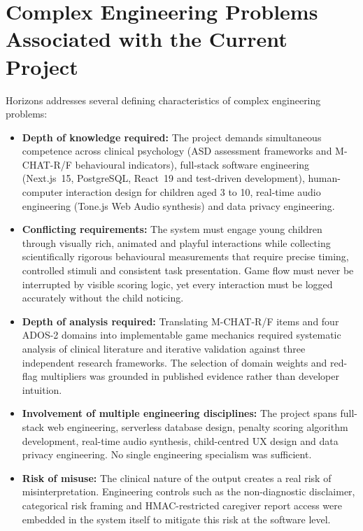 \documentclass[12pt,a4paper,oneside]{report}
\begin{document}
	\section{Complex Engineering Problems Associated with the Current Project}
	
	Horizons addresses several defining characteristics of complex engineering problems:
	
	\begin{itemize}[leftmargin=0.5in]
		\item \textbf{Depth of knowledge required:} The project demands simultaneous competence across clinical psychology (ASD assessment frameworks and M-CHAT-R/F behavioural indicators), full-stack software engineering (Next.js~15, PostgreSQL, React~19 and test-driven development), human-computer interaction design for children aged 3 to 10, real-time audio engineering (Tone.js Web Audio synthesis) and data privacy engineering.
		
		\item \textbf{Conflicting requirements:} The system must engage young children through visually rich, animated and playful interactions while collecting scientifically rigorous behavioural measurements that require precise timing, controlled stimuli and consistent task presentation. Game flow must never be interrupted by visible scoring logic, yet every interaction must be logged accurately without the child noticing.
		
		\item \textbf{Depth of analysis required:} Translating M-CHAT-R/F items and four ADOS-2 domains into implementable game mechanics required systematic analysis of clinical literature and iterative validation against three independent research frameworks. The selection of domain weights and red-flag multipliers was grounded in published evidence rather than developer intuition.
		
		\item \textbf{Involvement of multiple engineering disciplines:} The project spans full-stack web engineering, serverless database design, penalty scoring algorithm development, real-time audio synthesis, child-centred UX design and data privacy engineering. No single engineering specialism was sufficient.
		
		\item \textbf{Risk of misuse:} The clinical nature of the output creates a real risk of misinterpretation. Engineering controls such as the non-diagnostic disclaimer, categorical risk framing and HMAC-restricted caregiver report access were embedded in the system itself to mitigate this risk at the software level.
	\end{itemize}
	
\end{document}
